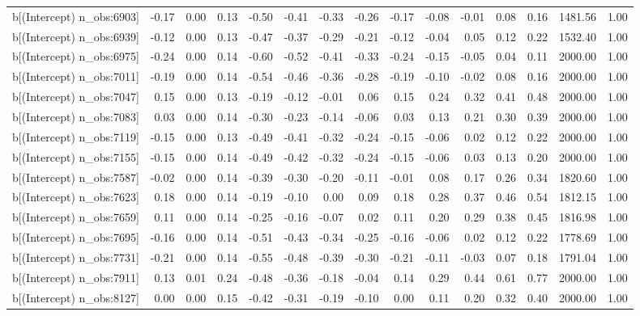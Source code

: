 \begin{table}[ht]
\begin{tabular}{rrrrrrrrrrrrrrr}
  b[(Intercept) n\_obs:6903] & -0.17 & 0.00 & 0.13 & -0.50 & -0.41 & -0.33 & -0.26 & -0.17 & -0.08 & -0.01 & 0.08 & 0.16 & 1481.56 & 1.00 \\ 
  b[(Intercept) n\_obs:6939] & -0.12 & 0.00 & 0.13 & -0.47 & -0.37 & -0.29 & -0.21 & -0.12 & -0.04 & 0.05 & 0.12 & 0.22 & 1532.40 & 1.00 \\ 
  b[(Intercept) n\_obs:6975] & -0.24 & 0.00 & 0.14 & -0.60 & -0.52 & -0.41 & -0.33 & -0.24 & -0.15 & -0.05 & 0.04 & 0.11 & 2000.00 & 1.00 \\ 
  b[(Intercept) n\_obs:7011] & -0.19 & 0.00 & 0.14 & -0.54 & -0.46 & -0.36 & -0.28 & -0.19 & -0.10 & -0.02 & 0.08 & 0.16 & 2000.00 & 1.00 \\ 
  b[(Intercept) n\_obs:7047] & 0.15 & 0.00 & 0.13 & -0.19 & -0.12 & -0.01 & 0.06 & 0.15 & 0.24 & 0.32 & 0.41 & 0.48 & 2000.00 & 1.00 \\ 
  b[(Intercept) n\_obs:7083] & 0.03 & 0.00 & 0.14 & -0.30 & -0.23 & -0.14 & -0.06 & 0.03 & 0.13 & 0.21 & 0.30 & 0.39 & 2000.00 & 1.00 \\ 
  b[(Intercept) n\_obs:7119] & -0.15 & 0.00 & 0.13 & -0.49 & -0.41 & -0.32 & -0.24 & -0.15 & -0.06 & 0.02 & 0.12 & 0.22 & 2000.00 & 1.00 \\ 
  b[(Intercept) n\_obs:7155] & -0.15 & 0.00 & 0.14 & -0.49 & -0.42 & -0.32 & -0.24 & -0.15 & -0.06 & 0.03 & 0.13 & 0.20 & 2000.00 & 1.00 \\ 
  b[(Intercept) n\_obs:7587] & -0.02 & 0.00 & 0.14 & -0.39 & -0.30 & -0.20 & -0.11 & -0.01 & 0.08 & 0.17 & 0.26 & 0.34 & 1820.60 & 1.00 \\ 
  b[(Intercept) n\_obs:7623] & 0.18 & 0.00 & 0.14 & -0.19 & -0.10 & 0.00 & 0.09 & 0.18 & 0.28 & 0.37 & 0.46 & 0.54 & 1812.15 & 1.00 \\ 
  b[(Intercept) n\_obs:7659] & 0.11 & 0.00 & 0.14 & -0.25 & -0.16 & -0.07 & 0.02 & 0.11 & 0.20 & 0.29 & 0.38 & 0.45 & 1816.98 & 1.00 \\ 
  b[(Intercept) n\_obs:7695] & -0.16 & 0.00 & 0.14 & -0.51 & -0.43 & -0.34 & -0.25 & -0.16 & -0.06 & 0.02 & 0.12 & 0.22 & 1778.69 & 1.00 \\ 
  b[(Intercept) n\_obs:7731] & -0.21 & 0.00 & 0.14 & -0.55 & -0.48 & -0.39 & -0.30 & -0.21 & -0.11 & -0.03 & 0.07 & 0.18 & 1791.04 & 1.00 \\ 
  b[(Intercept) n\_obs:7911] & 0.13 & 0.01 & 0.24 & -0.48 & -0.36 & -0.18 & -0.04 & 0.14 & 0.29 & 0.44 & 0.61 & 0.77 & 2000.00 & 1.00 \\ 
  b[(Intercept) n\_obs:8127] & 0.00 & 0.00 & 0.15 & -0.42 & -0.31 & -0.19 & -0.10 & 0.00 & 0.11 & 0.20 & 0.32 & 0.40 & 2000.00 & 1.00 \\ 

\end{tabular}
\end{table}
